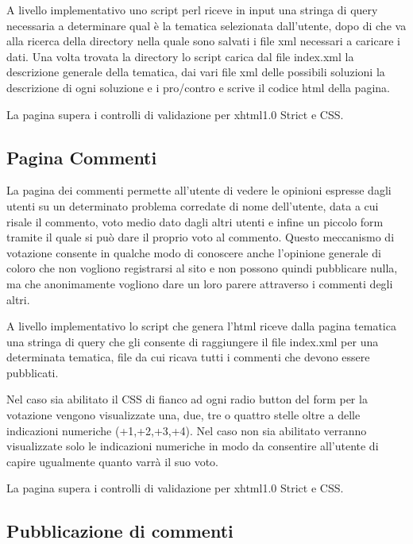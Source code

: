 \documentclass[a4paper,10pt]{article}
\begin{document}
A livello implementativo uno script perl riceve in input una stringa di query necessaria a determinare qual \`e la tematica selezionata dall'utente, dopo di che va alla ricerca della directory nella quale sono salvati i file xml necessari a caricare i dati. Una volta trovata la directory lo script carica dal file index.xml la descrizione generale della tematica, dai vari file xml delle possibili soluzioni la descrizione di ogni soluzione e i pro/contro e scrive il codice html della pagina.

La pagina supera i controlli di validazione per xhtml1.0 Strict e CSS.


\subsection{Pagina Commenti}

La pagina dei commenti permette all'utente di vedere le opinioni espresse dagli utenti su un determinato problema
 corredate di nome dell'utente, data a cui risale il commento, voto medio dato dagli altri utenti e infine un piccolo 
form tramite il quale si pu\`o dare il proprio voto al commento. Questo meccanismo di votazione consente in qualche modo di conoscere anche l'opinione generale di coloro che non vogliono registrarsi al sito e non possono quindi pubblicare nulla, ma che anonimamente vogliono dare un loro parere attraverso i commenti degli altri.

A livello implementativo lo script che genera l'html riceve dalla pagina tematica una stringa di query che gli consente di raggiungere il file index.xml per una determinata tematica, file da cui ricava tutti i commenti che devono essere pubblicati.

Nel caso sia abilitato il CSS di fianco ad ogni radio button del form per la votazione vengono visualizzate una, due, tre o quattro stelle oltre a delle indicazioni numeriche (+1,+2,+3,+4). Nel caso non sia abilitato verranno visualizzate solo le indicazioni numeriche in modo da consentire all'utente di capire ugualmente quanto varr\`a il suo voto.

La pagina supera i controlli di validazione per xhtml1.0 Strict e CSS.

\subsection{Pubblicazione di commenti}
\end{document}
